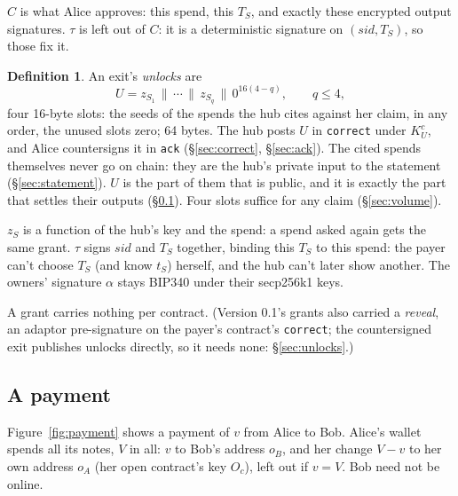 \documentclass[11pt]{article}
\theoremstyle{plain}
\theoremstyle{definition}
\newtheorem{definition}{Definition}
\newcommand{\tx}[1]{\texttt{#1}}
\newcommand{\sid}{\mathit{sid}}
\newcommand{\Oc}{O_c}
\newcommand{\KU}{K_{U}^{c}}
\begin{document}
$C$ is what Alice approves: this spend, this $T_S$, and exactly these
encrypted output signatures. $\tau$ is left out of $C$: it is a
deterministic signature on $(\sid, T_S)$, so those fix it.

\begin{definition}
An exit's \emph{unlocks} are
\[
  U = z_{S_1} \,\|\, \cdots \,\|\, z_{S_q} \,\|\, 0^{16(4 - q)},
  \qquad q \le 4,
\]
four 16-byte slots: the seeds of the spends the hub cites against her
claim, in any order, the unused slots zero; 64 bytes. The hub posts $U$
in \tx{correct} under $\KU$, and Alice countersigns it in \tx{ack}
(\S\ref{sec:correct}, \S\ref{sec:ack}). The cited spends themselves never
go on chain: they are the hub's private input to the statement
(\S\ref{sec:statement}). $U$ is the part of them that is public, and it
is exactly the part that settles their outputs (\S\ref{sec:payment}).
Four slots suffice for any claim (\S\ref{sec:volume}).
\end{definition}

$z_S$ is a function of the hub's key and the spend: a spend asked again
gets the same grant. $\tau$ signs $\sid$ and $T_S$ together, binding
this $T_S$ to this spend: the payer can't choose $T_S$ (and know $t_S$)
herself, and the hub can't later show another. The owners' signature
$\alpha$ stays BIP340 under their secp256k1 keys.

A grant carries nothing per contract. (Version 0.1's grants also carried
a \emph{reveal}, an adaptor pre-signature on the payer's contract's
\tx{correct}; the countersigned exit publishes unlocks directly, so it
needs none: \S\ref{sec:unlocks}.)

\subsection{A payment}\label{sec:payment}

Figure~\ref{fig:payment} shows a payment of $v$ from Alice to Bob.
Alice's wallet spends all its notes, $V$ in all: $v$ to Bob's address
$o_B$, and her change $V - v$ to her own address $o_A$ (her open
contract's key $\Oc$), left out if $v = V$. Bob need not be online.
\end{document}
